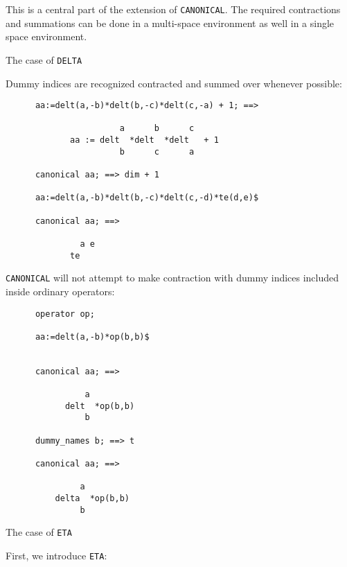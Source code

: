 This is a central part of the extension of \texttt{CANONICAL}. 
The required contractions and summations can be done in a 
multi-space environment as well in a single space environment.
\begin{center} 
The case of \texttt{DELTA}
\end{center}
Dummy indices are recognized  contracted and summed over whenever possible:
\begin{verbatim}
      aa:=delt(a,-b)*delt(b,-c)*delt(c,-a) + 1; ==>

                       a      b      c
             aa := delt  *delt  *delt   + 1
                       b      c      a

      canonical aa; ==> dim + 1

      aa:=delt(a,-b)*delt(b,-c)*delt(c,-d)*te(d,e)$

      canonical aa; ==> 

               a e
             te
\end{verbatim}
\texttt{CANONICAL} will not attempt to make contraction with 
dummy indices included inside ordinary operators:
\begin{verbatim}
      operator op;

      aa:=delt(a,-b)*op(b,b)$


      canonical aa; ==>

                a
            delt  *op(b,b)
                b

      dummy_names b; ==> t

      canonical aa; ==>

               a
          delta  *op(b,b)
               b
\end{verbatim}
\begin{center} 
The case of \texttt{ETA}
\end{center}
First, we introduce  \texttt{ETA}:
